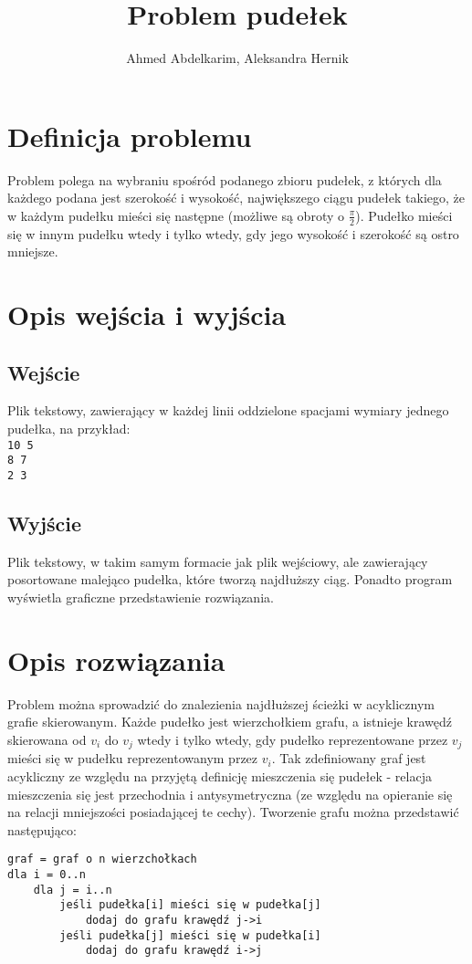 \documentclass{article}
\title{Problem pudełek}
\author{Ahmed Abdelkarim, Aleksandra Hernik}
\begin{document}
\maketitle
\section{Definicja problemu}
Problem polega na wybraniu spośród podanego zbioru pudełek, z których dla każdego podana jest szerokość i wysokość, największego ciągu pudełek takiego, że w każdym pudełku mieści się następne (możliwe są obroty o $\frac{\pi}{2}$). Pudełko mieści się w innym pudełku wtedy i tylko wtedy, gdy jego wysokość i szerokość są ostro mniejsze. 
\section{Opis wejścia i wyjścia}
\subsection{Wejście}
Plik tekstowy, zawierający w każdej linii oddzielone spacjami wymiary jednego pudełka, na przykład:\\
\texttt{10 5\\8 7\\2 3}
\subsection{Wyjście}
Plik tekstowy, w takim samym formacie jak plik wejściowy, ale zawierający posortowane malejąco pudełka, które tworzą najdłuższy ciąg. Ponadto program wyświetla graficzne przedstawienie rozwiązania.
\section{Opis rozwiązania}
Problem można sprowadzić do znalezienia najdłuższej ścieżki w acyklicznym grafie skierowanym. Każde pudełko jest wierzchołkiem grafu, a istnieje krawędź skierowana od $v_i$ do $v_j$ wtedy i tylko wtedy, gdy pudełko reprezentowane przez $v_j$ mieści się w pudełku reprezentowanym przez $v_i$. Tak zdefiniowany graf jest acykliczny ze względu na przyjętą definicję mieszczenia się pudełek - relacja mieszczenia się jest przechodnia i antysymetryczna (ze względu na opieranie się na relacji mniejszości posiadającej te cechy). Tworzenie grafu można przedstawić następująco:
\begin{verbatim}
graf = graf o n wierzchołkach
dla i = 0..n
	dla j = i..n
		jeśli pudełka[i] mieści się w pudełka[j]
			dodaj do grafu krawędź j->i
		jeśli pudełka[j] mieści się w pudełka[i]
			dodaj do grafu krawędź i->j
\end{verbatim}
\end{document}
